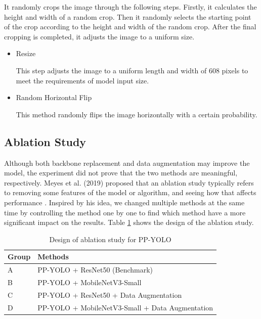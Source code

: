 \documentclass[sensors,article,submit,moreauthors,pdftex]{Definitions/mdpi}
\begin{document}
\begin{paracol}{2}
\begin{itemize}
\begin{itemize}
 It randomly crops the image through the following steps. Firstly, it calculates the height and width of a random crop. Then it randomly selects the starting point of the crop according to the height and width of the random crop. After the final cropping is completed, it adjusts the image to a uniform size.

\end{itemize}


\begin{itemize}
\item{Resize}

This step adjusts the image to a uniform length and width of 608 pixels to meet the requirements of model input size.

\end{itemize}


\begin{itemize}
\item{Random Horizontal Flip}

This method randomly flips the image horizontally with a certain probability.

\end{itemize}
\end{itemize}


\subsection{Ablation Study}
Although both backbone replacement and data augmentation may improve the model, the experiment did not prove that the two methods are meaningful, respectively. Meyes et al. (2019) proposed that an ablation study typically refers to removing some features of the model or algorithm, and seeing how that affects performance \cite{meyes2019ablation}.
Inspired by his idea, we changed multiple methods at the same time by controlling the method one by one to find which method have a more significant impact on the results. Table \ref{tbl:design of ablation study for PP-YOLO} shows the design of the ablation study.

\begin{table}[htbp]
\centering
\caption{Design of ablation study for PP-YOLO}
\begin{tabular}{ll} 
\toprule
\textbf{Group}&\textbf{Methods}\\
\midrule
A& PP-YOLO + ResNet50 (Benchmark) \\
\cmidrule(r){1-2}
B& PP-YOLO + MobileNetV3-Small \\
C& PP-YOLO + ResNet50 + Data Augmentation \\
D& PP-YOLO + MobileNetV3-Small + Data Augmentation\\
\bottomrule
\end{tabular}
\label{tbl:design of ablation study for PP-YOLO}
\end{table}



\end{paracol}
\end{document}
